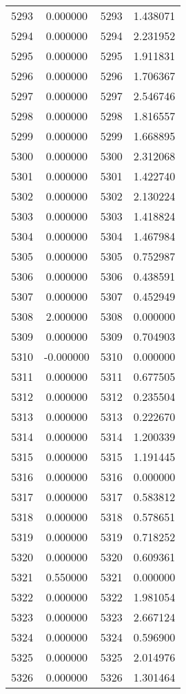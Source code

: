 \documentclass[12pt]{article}
\begin{document}
\begin{longtable}{@{}cccc@{}}
5293 & 0.000000 & 5293 & 1.438071 \\
5294 & 0.000000 & 5294 & 2.231952 \\
5295 & 0.000000 & 5295 & 1.911831 \\
5296 & 0.000000 & 5296 & 1.706367 \\
5297 & 0.000000 & 5297 & 2.546746 \\
5298 & 0.000000 & 5298 & 1.816557 \\
5299 & 0.000000 & 5299 & 1.668895 \\
5300 & 0.000000 & 5300 & 2.312068 \\
5301 & 0.000000 & 5301 & 1.422740 \\
5302 & 0.000000 & 5302 & 2.130224 \\
5303 & 0.000000 & 5303 & 1.418824 \\
5304 & 0.000000 & 5304 & 1.467984 \\
5305 & 0.000000 & 5305 & 0.752987 \\
5306 & 0.000000 & 5306 & 0.438591 \\
5307 & 0.000000 & 5307 & 0.452949 \\
5308 & 2.000000 & 5308 & 0.000000 \\
5309 & 0.000000 & 5309 & 0.704903 \\
5310 & -0.000000 & 5310 & 0.000000 \\
5311 & 0.000000 & 5311 & 0.677505 \\
5312 & 0.000000 & 5312 & 0.235504 \\
5313 & 0.000000 & 5313 & 0.222670 \\
5314 & 0.000000 & 5314 & 1.200339 \\
5315 & 0.000000 & 5315 & 1.191445 \\
5316 & 0.000000 & 5316 & 0.000000 \\
5317 & 0.000000 & 5317 & 0.583812 \\
5318 & 0.000000 & 5318 & 0.578651 \\
5319 & 0.000000 & 5319 & 0.718252 \\
5320 & 0.000000 & 5320 & 0.609361 \\
5321 & 0.550000 & 5321 & 0.000000 \\
5322 & 0.000000 & 5322 & 1.981054 \\
5323 & 0.000000 & 5323 & 2.667124 \\
5324 & 0.000000 & 5324 & 0.596900 \\
5325 & 0.000000 & 5325 & 2.014976 \\
5326 & 0.000000 & 5326 & 1.301464 \\

\end{longtable}
\end{document}
